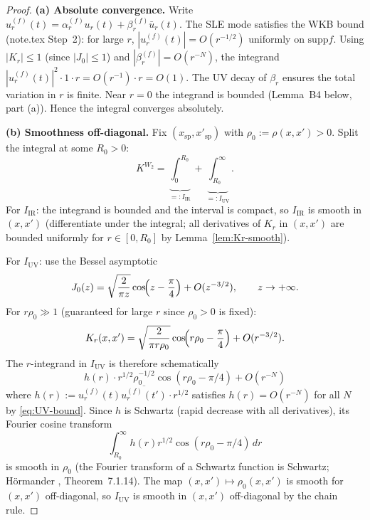 \documentclass[12pt, a4paper]{article}
\theoremstyle{remark}
\newcommand{\supp}{\mathrm{supp}}
\begin{document}
\begin{proof}
  \textbf{(a) Absolute convergence.}
  Write $u_r^{(f)}(t) = \alpha_r^{(f)} u_r(t) + \beta_r^{(f)}\bar{u}_r(t)$.
  The SLE mode satisfies the WKB bound (note.tex Step~2):
  for large $r$, $|u_r^{(f)}(t)| = O(r^{-1/2})$ uniformly on $\supp f$.
  Using $|K_r| \le 1$ (since $|J_0| \le 1$) and $|\beta_r^{(f)}|=O(r^{-N})$,
  the integrand $|u_r^{(f)}(t)|^2 \cdot 1 \cdot r = O(r^{-1})\cdot r = O(1)$.
  The UV decay of $\beta_r$ ensures the total variation in $r$ is finite.
  Near $r = 0$ the integrand is bounded (Lemma~B4 below, part (a)).
  Hence the integral converges absolutely.

  \textbf{(b) Smoothness off-diagonal.}
  Fix $(x_{\mathrm{sp}}, x'_{\mathrm{sp}})$ with $\rho_0 := \rho(x,x') > 0$.
  Split the integral at some $R_0 > 0$:
  \begin{equation}
    K^{W_2} = \underbrace{\int_0^{R_0}}_{=: I_{\mathrm{IR}}}
             + \underbrace{\int_{R_0}^\infty}_{=: I_{\mathrm{UV}}}.
  \end{equation}
  For $I_{\mathrm{IR}}$: the integrand is bounded and the interval is compact,
  so $I_{\mathrm{IR}}$ is smooth in $(x,x')$ (differentiate under the integral;
  all derivatives of $K_r$ in $(x,x')$ are bounded uniformly for $r \in [0,R_0]$
  by Lemma~\ref{lem:Kr-smooth}).

  For $I_{\mathrm{UV}}$: use the Bessel asymptotic
  \begin{equation}\label{eq:J0-asymp}
    J_0(z) = \sqrt{\frac{2}{\pi z}}\cos\!\Bigl(z - \frac{\pi}{4}\Bigr)
             + O(z^{-3/2}), \qquad z \to +\infty.
  \end{equation}
  For $r \rho_0 \gg 1$ (guaranteed for large $r$ since $\rho_0 > 0$ is fixed):
  \begin{equation}
    K_r(x,x') = \sqrt{\frac{2}{\pi r\rho_0}}
                \cos\!\Bigl(r\rho_0 - \frac{\pi}{4}\Bigr)
                + O(r^{-3/2}).
  \end{equation}
  The $r$-integrand in $I_{\mathrm{UV}}$ is therefore schematically
  \begin{equation}
    h(r) \cdot r^{1/2}\rho_0^{-1/2}\cos(r\rho_0 - \pi/4) + O(r^{-N})
  \end{equation}
  where $h(r) := u_r^{(f)}(t)\overline{u_r^{(f)}(t')} \cdot r^{1/2}$
  satisfies $h(r) = O(r^{-N})$ for all $N$ by \eqref{eq:UV-bound}.
  Since $h$ is Schwartz (rapid decrease with all derivatives), its
  Fourier cosine transform
  \begin{equation}
    \int_{R_0}^\infty h(r) r^{1/2} \cos(r\rho_0 - \pi/4)\,dr
  \end{equation}
  is smooth in $\rho_0$ (the Fourier transform of a Schwartz function is
  Schwartz; H\"ormander \cite{Hor90}, Theorem~7.1.14).
  The map $(x,x') \mapsto \rho_0(x,x')$ is smooth for $(x,x')$ off-diagonal,
  so $I_{\mathrm{UV}}$ is smooth in $(x,x')$ off-diagonal by the chain rule.


\end{proof}
\end{document}
